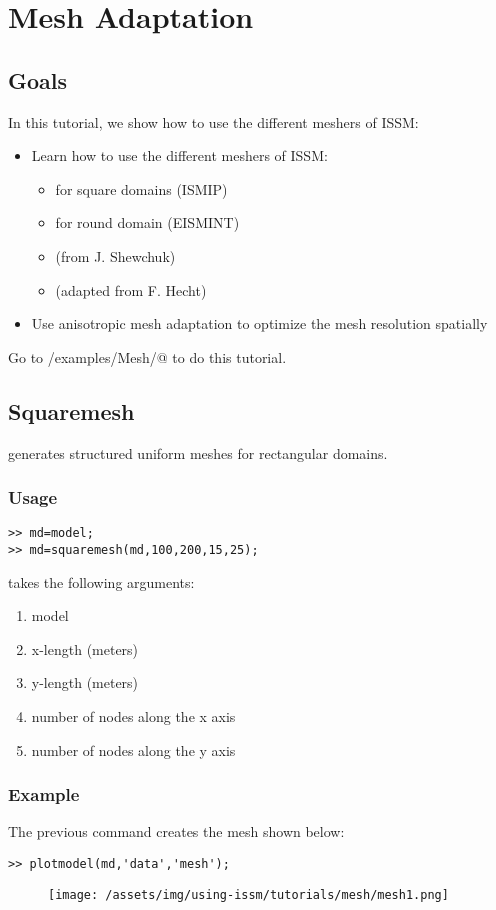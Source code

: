 \section{Mesh Adaptation}
\subsection{Goals} %
In this tutorial, we show how to use the different meshers of ISSM:
\begin{itemize}
	\item Learn how to use the different meshers of ISSM:
		\begin{itemize}
			\item \verb@squaremesh@ for square domains (ISMIP)
			\item \verb@roundmesh@ for round domain (EISMINT)
			\item \verb@triangle@ (from J. Shewchuk)
			\item \verb@bamg@ (adapted from F. Hecht)
		\end{itemize}
	\item Use anisotropic mesh adaptation to optimize the mesh resolution spatially
\end{itemize}
Go to \verb@trunk/examples/Mesh/@ to do this tutorial.
\subsection{Squaremesh}%
\verb@squaremesh@ generates structured uniform meshes for rectangular domains.
\subsubsection{Usage}
\begin{verbatim}>> md=model;
>> md=squaremesh(md,100,200,15,25);
\end{verbatim}
\verb@squaremesh@ takes the following arguments:
\begin{enumerate}
	\item model
	\item x-length (meters)
	\item y-length (meters)
	\item number of nodes along the x axis
	\item number of nodes along the y axis
\end{enumerate}
\subsubsection{Example}
The previous command creates the mesh shown below:
\begin{verbatim}>> plotmodel(md,'data','mesh');\end{verbatim}
\begin{figure}[H]
	\begin{center}
		\texttt{[image: /assets/img/using-issm/tutorials/mesh/mesh1.png]}
	\end{center}
\end{figure}

